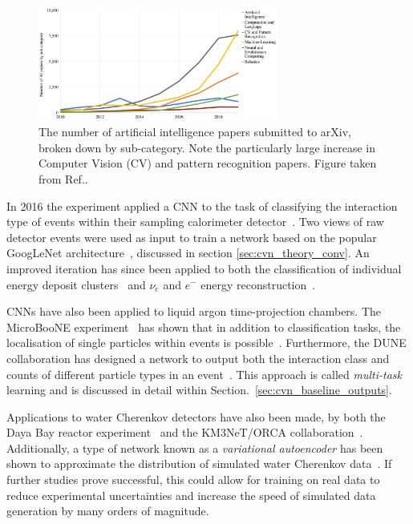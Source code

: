 \begin{figure} %
    \includegraphics[width=0.7\textwidth]{diagrams/6-cvn/papers.png}
    \caption[papers short]
    {The number of artificial intelligence papers submitted to arXiv, broken down by sub-category.
        Note the particularly large increase in Computer Vision (CV) and pattern recognition
        papers. Figure taken from Ref.\cite{perrault2019}.}
    \label{fig:papers}
\end{figure}

In 2016 the \nova experiment applied a CNN to the task of classifying the interaction type of
events within their sampling calorimeter detector~\cite{aurisano2016}. Two views of raw detector
events were used as input to train a network based on the popular GoogLeNet
architecture~\cite{szegedy2015}, discussed in section \ref{sec:cvn_theory_conv}. An improved
iteration has since been applied to both the classification of individual energy deposit
clusters~\cite{psihas2019} and $\nu_{e}$ and $e^{-}$ energy reconstruction~\cite{baldi2019}.

CNNs have also been applied to liquid argon time-projection chambers. The MicroBooNE
experiment~\cite{acciarri2017_ref} has shown that in addition to classification tasks, the
localisation of single particles within events is possible~\cite{acciarri2017}. Furthermore, the
DUNE collaboration has designed a network to output both the interaction class and counts of
different particle types in an event~\cite{collaboration2020, abi2020}. This approach is called
\emph{multi-task} learning and is discussed in detail within
Section.~\ref{sec:cvn_baseline_outputs}.

Applications to water Cherenkov detectors have also been made, by both the Daya Bay reactor
experiment~\cite{racah2016} and the KM3NeT/ORCA collaboration~\cite{aiello2020}. Additionally, a
type of network known as a \emph{variational autoencoder} has been shown to approximate the
distribution of simulated water Cherenkov data~\cite{abhishek2019}. If further studies prove
successful, this could allow for training on real data to reduce experimental uncertainties and
increase the speed of simulated data generation by many orders of magnitude.

